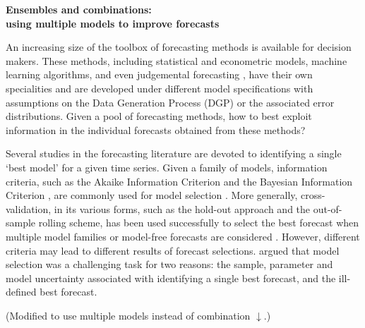 \documentclass[11pt]{article}
\begin{document}
\def\spacingset#1{\renewcommand{\baselinestretch}%
{#1}\small\normalsize} \spacingset{1}

\begin{center}
{\bf\Large Ensembles and combinations: \\using multiple models to improve forecasts}
\end{center}


\bigskip


\spacingset{1.5} 


An increasing size of the toolbox of forecasting methods is available for decision makers. These methods, including statistical and econometric models, machine learning algorithms, and even judgemental forecasting \citep[see an encyclopedic overview by][]{petropoulos2020forecasting}, have their own specialities and are developed under different model specifications with assumptions on the Data Generation Process (DGP) or the associated error distributions. Given a pool of forecasting methods, how to best exploit information in the individual forecasts obtained from these methods?

Several studies in the forecasting literature are devoted to identifying a single `best model' for a given time series. Given a family of models, information criteria, such as the Akaike Information Criterion \citep[AIC,][]{Akaike1974-ya} and the Bayesian Information Criterion \citep[BIC,][]{Schwarz1978-cz}, are commonly used for model selection \citep[e.g.,][]{qi2001investigation,billah2005empirical,yang2005can}. More generally, cross-validation, in its various forms, such as the hold-out approach and the out-of-sample rolling scheme, has been used successfully to select the best forecast when multiple model families or model-free forecasts are considered \citep[e.g.,][]{kohavi1995study,poler2011forecasting,fildes2015simple,inoue2017rolling,talagala2018meta}. However, different criteria may lead to different results of forecast selections. \cite{Kourentzes2019-na} argued that model selection was a challenging task for two reasons: the sample, parameter and model uncertainty associated with identifying a single best forecast, and the ill-defined best forecast.

{\color{red} (Modified to use multiple models instead of combination $\downarrow$.)}
\end{document}

